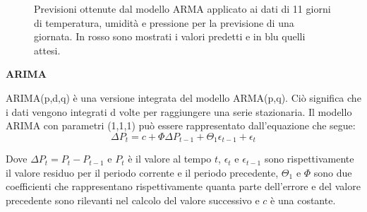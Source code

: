 \documentclass{article}
\begin{document}
 
\begin{figure}
    \centering
    \qquad
    \qquad
    \caption{Previsioni ottenute dal modello ARMA applicato ai dati di 11 giorni di temperatura, umidità e pressione per la previsione
    di una giornata. In rosso sono mostrati i valori predetti e in blu quelli attesi.}
    \label{fig:arma}
\end{figure}

\bigskip
\textbf{ARIMA}
\medskip

ARIMA(p,d,q) è una versione integrata del modello ARMA(p,q). Ciò significa che i dati vengono integrati d volte per raggiungere una serie stazionaria.
Il modello ARIMA con parametri (1,1,1) può essere rappresentato dall'equazione che segue\cite{arima}:
$$\Delta P_t = c + \Phi \Delta P_{t-1} + \Theta_1\epsilon_{t-1} + \epsilon_t$$

Dove $\Delta P_t = P_t - P_{t-1}$ e $P_t$ è il valore al tempo $t$, $\epsilon_t$ e $\epsilon_{t-1}$ sono rispettivamente il valore residuo per il periodo corrente e il periodo precedente, $\Theta_1$ e $\Phi$ sono due coefficienti che rappresentano rispettivamente quanta parte dell'errore e del valore precedente sono rilevanti nel calcolo del valore successivo e $c$ è una costante.
\end{document}
